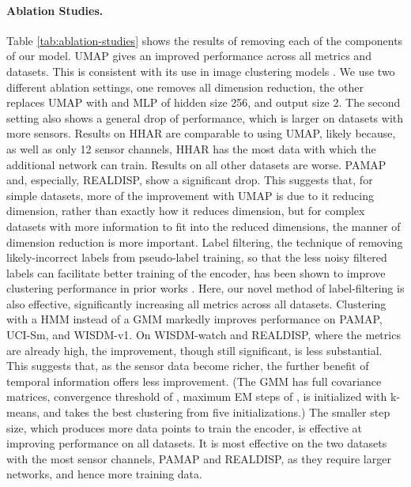 \documentclass[wcp]{jmlr}
\begin{document}
\paragraph{Ablation Studies.}
Table \ref{tab:ablation-studies} shows the results of removing each of the components of our model. 
UMAP gives an improved performance across all metrics and datasets. This is consistent with its use in image clustering models \citep{allaoui2020considerably}. We use two different ablation settings, one removes all dimension reduction, the other replaces UMAP with and MLP of hidden size 256, and output size 2. The second setting also shows a general drop of performance, which is larger on datasets with more sensors. Results on HHAR are comparable to using UMAP, likely because, as well as only 12 sensor channels, HHAR has the most data with which the additional network can train. Results on all other datasets are worse.
PAMAP and, especially, REALDISP, show a significant drop. This suggests that, for simple datasets, more of the improvement with UMAP is due to it reducing dimension, rather than exactly how it reduces dimension, but for complex datasets with more information to fit into the reduced dimensions, the manner of dimension reduction is more important. 
Label filtering, the technique of removing likely-incorrect labels from pseudo-label training, so that the less noisy filtered labels can facilitate better training of the encoder, has been shown to improve clustering performance in prior works 
\citep{mrabah2020deep,mahon2021selective}. Here, our novel method of label-filtering is also effective, significantly increasing all metrics across all datasets.
Clustering with a HMM instead of a GMM markedly improves performance on PAMAP, UCI-Sm, and WISDM-v1. On WISDM-watch and REALDISP, where the metrics are already high, the improvement, though still significant, is less substantial. This suggests that, as the sensor data become richer, the further benefit of temporal information offers less improvement. (The GMM has full covariance matrices, convergence threshold of , maximum EM steps of , is initialized with k-means, and takes the best clustering from five initializations.) 
The smaller step size, which produces more data points to train the encoder, is effective at improving performance on all datasets. It is most effective on the two datasets with the most sensor channels, PAMAP and REALDISP, as they require larger networks, and hence more training data.
\end{document}
